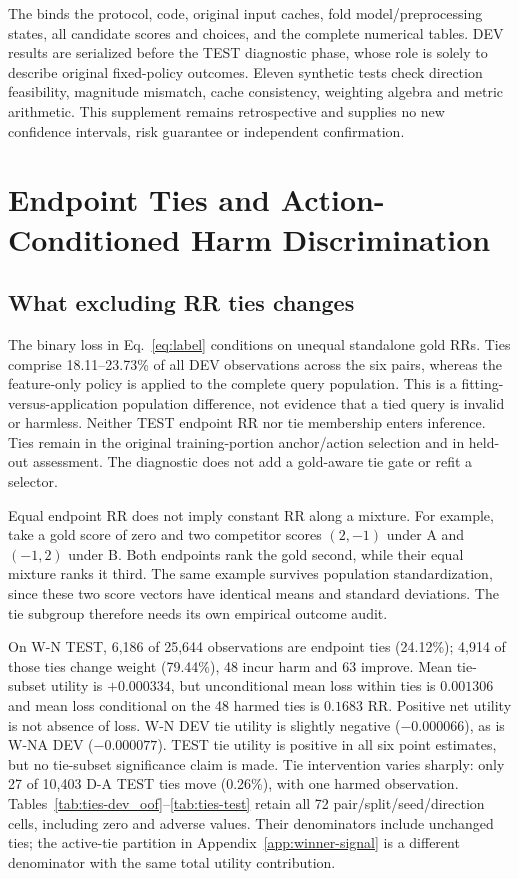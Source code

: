 \documentclass[11pt,a4paper]{article}
\begin{document}
The  binds the protocol, code, original input caches, fold model/preprocessing states, all candidate scores and choices, and the complete numerical tables. DEV results are serialized before the TEST diagnostic phase, whose role is solely to describe original fixed-policy outcomes. Eleven synthetic tests check direction feasibility, magnitude mismatch, cache consistency, weighting algebra and metric arithmetic. This supplement remains retrospective and supplies no new confidence intervals, risk guarantee or independent confirmation.
\FloatBarrier

\section{Endpoint Ties and Action-Conditioned Harm Discrimination}
\label{app:ties-harm}

\subsection{What excluding RR ties changes}
The binary loss in Eq.~\eqref{eq:label} conditions on unequal standalone gold RRs. Ties comprise 18.11--23.73\% of all DEV observations across the six pairs, whereas the feature-only policy is applied to the complete query population. This is a fitting-versus-application population difference, not evidence that a tied query is invalid or harmless. Neither TEST endpoint RR nor tie membership enters inference. Ties remain in the original training-portion anchor/action selection and in held-out assessment. The diagnostic does not add a gold-aware tie gate or refit a selector.

Equal endpoint RR does not imply constant RR along a mixture. For example, take a gold score of zero and two competitor scores $(2,-1)$ under A and $(-1,2)$ under B. Both endpoints rank the gold second, while their equal mixture ranks it third. The same example survives population standardization, since these two score vectors have identical means and standard deviations. The tie subgroup therefore needs its own empirical outcome audit.



On W-N TEST, 6,186 of 25,644 observations are endpoint ties (24.12\%); 4,914 of those ties change weight (79.44\%), 48 incur harm and 63 improve. Mean tie-subset utility is $+0.000334$, but unconditional mean loss within ties is $0.001306$ and mean loss conditional on the 48 harmed ties is $0.1683$ RR. Positive net utility is not absence of loss. W-N DEV tie utility is slightly negative ($-0.000066$), as is W-NA DEV ($-0.000077$). TEST tie utility is positive in all six point estimates, but no tie-subset significance claim is made. Tie intervention varies sharply: only 27 of 10,403 D-A TEST ties move (0.26\%), with one harmed observation. Tables~\ref{tab:ties-dev_oof}--\ref{tab:ties-test} retain all 72 pair/split/seed/direction cells, including zero and adverse values. Their denominators include unchanged ties; the active-tie partition in Appendix~\ref{app:winner-signal} is a different denominator with the same total utility contribution.
\end{document}
